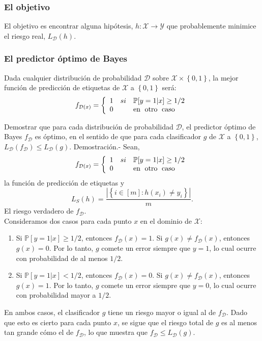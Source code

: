 \subsubsection{El objetivo}
El objetivo es encontrar alguna hipótesis, $h:\mathcal{X}\to \mathcal{Y}$ que probablemente minimice el riesgo real, $L_{\mathcal{D}}(h)$. 

\subsubsection{El predictor óptimo de Bayes} 
Dada cualquier distribución de probabilidad $\mathcal{D}$ sobre $\mathcal{X} \times \left\{0,1\right\}$, la mejor función de predicción de etiquetas de $\mathcal{X}$ a $\left\{0,1\right\}$ será:
$$
f_{\mathcal{D}(x)} = \left\{
    \begin{array}{rcl}
	1 & si & \mathbb{P}[y=1 | x] \geq 1/2\\
	0 && \text{en \;otro \;caso}
    \end{array}
\right.
$$

\begin{teo} Demostrar que para cada distribución de probabilidad $\mathcal{D}$, el predictor óptimo de Bayes $f_{\mathcal{D}}$ es óptimo, en el sentido de que para cada clasificador $g$  de $\mathcal{X}$ a $\left\{0,1\right\}$, $L_{\mathcal{D}}(f_{\mathcal{D}}) \leq L_{\mathcal{D}}(g)$.
	Demostración.-\; Sean, 
$$
f_{\mathcal{D}(x)} = \left\{
    \begin{array}{rcl}
	1 & si & \mathbb{P}[y=1 | x] \geq 1/2\\
	0 && \text{en \;otro \;caso}
    \end{array}
\right.
$$
la función de predicción de etiquetas y 
$$L_S(h) = \dfrac{|\left\{i\in [m]:h(x_i)\neq y_i\right\}|}{m}.$$
El riesgo verdadero de $f_{\mathcal{D}}$. \\

Consideramos dos casos para cada punto $x$ en el dominio de $\mathcal{X}$:
\begin{enumerate}[1.]
    \item Si $\mathbb{P}[y=1 | x] \geq 1/2$, entonces $f_{\mathcal{D}}(x)=1$. Si $g(x)\neq f_{\mathcal{D}}(x)$, entonces $g(x)=0$. Por lo tanto, $g$ comete un error siempre que $y=1$, lo cual ocurre con probabilidad de al menos $1/2$.
    \item Si $\mathbb{P}[y=1 | x] < 1/2$, entonces $f_{\mathcal{D}}(x)=0$. Si $g(x)\neq f_{\mathcal{D}}(x)$, entonces $g(x)=1$. Por lo tanto, $g$ comete un error siempre que $y=0$, lo cual ocurre con probabilidad mayor a $1/2$.
\end{enumerate}
En ambos casos, el clasificador $g$ tiene un riesgo mayor o igual al de $f_{\mathcal{D}}$. Dado que esto es cierto para cada punto $x$, se sigue que el riesgo total de $g$ es al menos tan grande cómo el de $f_{\mathcal{D}}$, lo que muestra que $f_{\mathcal{D}}\leq L_{\mathcal{D}}(g)$.
\end{teo}

